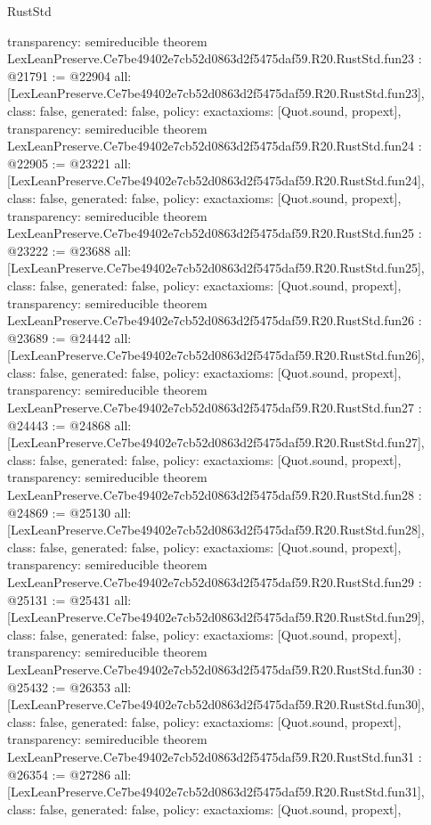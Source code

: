 \begin{lexlean}{RustStd}
\begin{coremodule}
{  transparency: semireducible
}
theorem LexLeanPreserve.Ce7be49402e7cb52d0863d2f5475daf59.R20.RustStd.fun23 : @21791 := @22904 {
  all: [LexLeanPreserve.Ce7be49402e7cb52d0863d2f5475daf59.R20.RustStd.fun23],
  class: false,
  generated: false,
  policy: exact{axioms: [Quot.sound, propext]},
  transparency: semireducible
}
theorem LexLeanPreserve.Ce7be49402e7cb52d0863d2f5475daf59.R20.RustStd.fun24 : @22905 := @23221 {
  all: [LexLeanPreserve.Ce7be49402e7cb52d0863d2f5475daf59.R20.RustStd.fun24],
  class: false,
  generated: false,
  policy: exact{axioms: [Quot.sound, propext]},
  transparency: semireducible
}
theorem LexLeanPreserve.Ce7be49402e7cb52d0863d2f5475daf59.R20.RustStd.fun25 : @23222 := @23688 {
  all: [LexLeanPreserve.Ce7be49402e7cb52d0863d2f5475daf59.R20.RustStd.fun25],
  class: false,
  generated: false,
  policy: exact{axioms: [Quot.sound, propext]},
  transparency: semireducible
}
theorem LexLeanPreserve.Ce7be49402e7cb52d0863d2f5475daf59.R20.RustStd.fun26 : @23689 := @24442 {
  all: [LexLeanPreserve.Ce7be49402e7cb52d0863d2f5475daf59.R20.RustStd.fun26],
  class: false,
  generated: false,
  policy: exact{axioms: [Quot.sound, propext]},
  transparency: semireducible
}
theorem LexLeanPreserve.Ce7be49402e7cb52d0863d2f5475daf59.R20.RustStd.fun27 : @24443 := @24868 {
  all: [LexLeanPreserve.Ce7be49402e7cb52d0863d2f5475daf59.R20.RustStd.fun27],
  class: false,
  generated: false,
  policy: exact{axioms: [Quot.sound, propext]},
  transparency: semireducible
}
theorem LexLeanPreserve.Ce7be49402e7cb52d0863d2f5475daf59.R20.RustStd.fun28 : @24869 := @25130 {
  all: [LexLeanPreserve.Ce7be49402e7cb52d0863d2f5475daf59.R20.RustStd.fun28],
  class: false,
  generated: false,
  policy: exact{axioms: [Quot.sound, propext]},
  transparency: semireducible
}
theorem LexLeanPreserve.Ce7be49402e7cb52d0863d2f5475daf59.R20.RustStd.fun29 : @25131 := @25431 {
  all: [LexLeanPreserve.Ce7be49402e7cb52d0863d2f5475daf59.R20.RustStd.fun29],
  class: false,
  generated: false,
  policy: exact{axioms: [Quot.sound, propext]},
  transparency: semireducible
}
theorem LexLeanPreserve.Ce7be49402e7cb52d0863d2f5475daf59.R20.RustStd.fun30 : @25432 := @26353 {
  all: [LexLeanPreserve.Ce7be49402e7cb52d0863d2f5475daf59.R20.RustStd.fun30],
  class: false,
  generated: false,
  policy: exact{axioms: [Quot.sound, propext]},
  transparency: semireducible
}
theorem LexLeanPreserve.Ce7be49402e7cb52d0863d2f5475daf59.R20.RustStd.fun31 : @26354 := @27286 {
  all: [LexLeanPreserve.Ce7be49402e7cb52d0863d2f5475daf59.R20.RustStd.fun31],
  class: false,
  generated: false,
  policy: exact{axioms: [Quot.sound, propext]},
}
\end{coremodule}
\end{lexlean}
